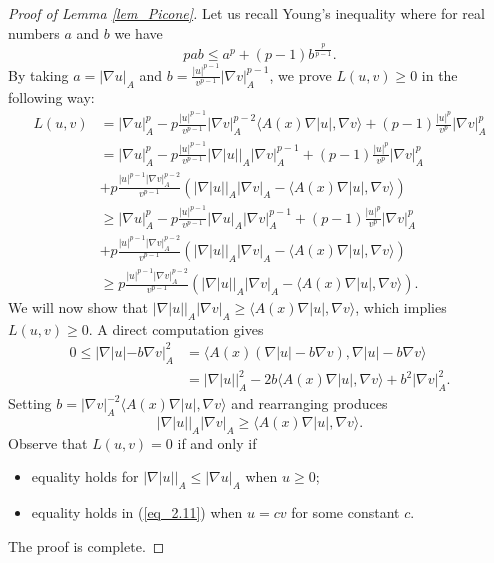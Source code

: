 \documentclass[a4paper,12pt,reqno]{amsart}
\renewcommand\eqref[1]{(\ref{#1})} %
\theoremstyle{theorem}
\numberwithin{equation}{section}
\theoremstyle{plain}
\theoremstyle{definition}
\theoremstyle{defi}
\begin{document}
\begin{proof}[Proof of Lemma \ref{lem_Picone}]
	
	Let us recall Young's inequality where for real numbers $a$ and $b$ we have
	\begin{equation*}
	p ab \leq a^p + (p-1)b^{\frac{p}{p-1}}.
	\end{equation*}
	By taking $a=|\nabla u|_A$ and $b=\frac{|u|^{p-1}}{v^{p-1}}|\nabla v|_A^{p-1}$, we prove $L(u,v)\geq 0$ in the following way:
	\begin{align*}
	L(u,v)& = |\nabla u|^p_A -p\frac{|u|^{p-1} }{v^{p-1}}|\nabla v|^{p-2}_A \langle A(x) \nabla|u|,\nabla v\rangle + (p-1)\frac{|u|^p}{v^p}|\nabla v|^p_A\\
	& =  |\nabla u|^p_A -p\frac{|u|^{p-1}}{v^{p-1}}|\nabla |u||_A|\nabla v|^{p-1}_A + (p-1)\frac{|u|^p}{v^p}|\nabla v|^p_A \\
	& + p\frac{|u|^{p-1}|\nabla v|^{p-2}_A}{v^{p-1}} \left( |\nabla |u||_A|\nabla v|_A -\langle A(x)\nabla |u|, \nabla v\rangle \right)  \\
	& \geq |\nabla u|^p_A -p\frac{|u|^{p-1}}{v^{p-1}}|\nabla u|_A|\nabla v|^{p-1}_A + (p-1)\frac{|u|^p}{v^p}|\nabla v|^p_A \\
	& + p\frac{|u|^{p-1}|\nabla v|^{p-2}_A}{v^{p-1}} \left( |\nabla |u||_A|\nabla v|_A - \langle A(x)\nabla |u|, \nabla v\rangle \right)\\
	& \geq p\frac{|u|^{p-1}|\nabla v|^{p-2}_A}{v^{p-1}} \left( |\nabla |u||_A|\nabla v|_A - \langle A(x)\nabla |u|, \nabla v\rangle \right).
	\end{align*}
	We will now show that $|\nabla |u||_A|\nabla v|_A \geq\langle A(x)\nabla |u|, \nabla v\rangle $, which implies $L(u,v)\geq 0$. A direct computation gives 
	\begin{align*}
	0 \leq | \nabla |u| - b\nabla v |^2_A &= \langle A(x) (\nabla |u| - b\nabla v), \nabla |u| - b\nabla v \rangle \\
	& =|\nabla |u||^2_A -2b\langle A(x) \nabla |u|,\nabla v\rangle + b^2 |\nabla v|^2_A.
	\end{align*}
	Setting $b=|\nabla v|_A^{-2} \langle A(x)\nabla |u|,\nabla v\rangle$ and rearranging produces 
	\begin{equation}\label{eq_2.11}
		|\nabla |u||_A|\nabla v|_A \geq\langle  A(x)\nabla |u|, \nabla v\rangle.
	\end{equation}
	Observe that $L(u,v)=0$ if and only if
	\begin{itemize}
		\item equality holds for $|\nabla |u||_A \leq |\nabla u|_A$ when $u\geq 0$;
		\item equality holds in \eqref{eq_2.11} when $u=cv$ for some constant $c$. 
	\end{itemize}
The proof is complete.
\end{proof}
\end{document}
